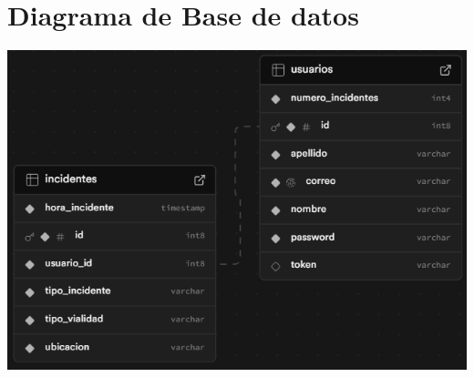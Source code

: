 \section{Diagrama de Base de datos}

\begin{center}
    \includegraphics[scale = .7]{Ite02/DBSupaBumper.png}
\end{center}
